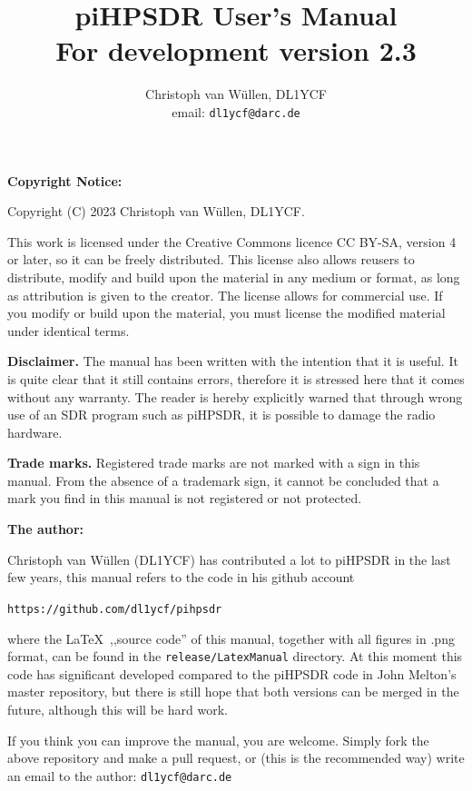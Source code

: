\documentclass[12pt]{book}
\begin{document}
\frontmatter
\title{
piHPSDR User's Manual \\
\small{For development version 2.3}
}
\author{
Christoph van W\"ullen, DL1YCF \\
email: \texttt{dl1ycf@darc.de}
}

%
\maketitle
\textbf{Copyright Notice:}

Copyright (C) 2023 Christoph van W\"ullen, DL1YCF.

This work is licensed under
the Creative Commons licence CC BY-SA, version 4 or later, so it can be freely distributed.
 This license also allows reusers to distribute, modify and build upon the material in any medium or format,
as long as attribution is given to the creator. The license allows for commercial use.
If you modify or build upon the material, you must license the modified material under identical terms.

\textbf{Disclaimer.} The manual has been written with the intention that it is useful. It is quite clear
that it still contains errors, therefore it is stressed here that it comes without any warranty. The reader
is hereby explicitly warned that through wrong use of an SDR program such as piHPSDR, it is possible to
damage the radio hardware.

\textbf{Trade marks.} Registered trade marks are not marked with a sign in this manual. From the absence of
a trademark sign, it cannot be concluded that a mark you find in this manual is not registered or not
protected.

\bigskip
\textbf{The author:}

Christoph van W\"ullen (DL1YCF) has contributed a lot to piHPSDR in the last few years, this manual refers
to the code in his github account

\texttt{https://github.com/dl1ycf/pihpsdr}

where the \LaTeX\   ,,source code'' of this manual, together with all figures in .png format, can be found
in the \texttt{release/LatexManual} directory. At this moment this code has significant developed compared
to the piHPSDR code in John Melton's master repository, but there is still hope that both versions can
be merged in  the  future, although this  will  be hard  work.

If you think you can improve the manual, you are welcome.
Simply fork the above repository and make a pull request, or (this is the recommended way) write an
email to the author: \texttt{dl1ycf@darc.de}
\tableofcontents
\mainmatter
\end{document}
